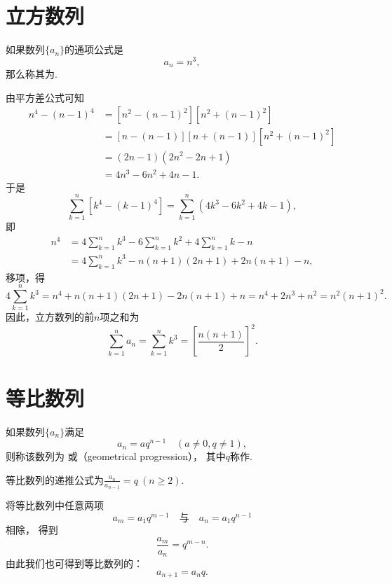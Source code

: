 \section{立方数列}
如果数列\(\{a_n\}\)的通项公式是\[
a_n = n^3,
\]那么称其为.

由平方差公式可知
\[\begin{aligned}
n^4 - (n-1)^4
&= [n^2 - (n-1)^2] [n^2 + (n-1)^2] \\
&= [n - (n-1)] [n + (n-1)] [n^2 + (n-1)^2] \\
&= (2n-1) (2n^2 - 2n + 1) \\
&= 4n^3 - 6n^2 + 4n - 1.
\end{aligned}\]
于是\[
\sum_{k=1}^n [k^4 - (k-1)^4]
= \sum_{k=1}^n (4k^3 - 6k^2 + 4k - 1),
\]即\[\begin{aligned}
n^4
&= 4 \sum_{k=1}^n k^3 - 6 \sum_{k=1}^n k^2 + 4 \sum_{k=1}^n k - n \\
&= 4 \sum_{k=1}^n k^3 - n(n+1)(2n+1) + 2n(n+1) - n,
\end{aligned}\]
移项，得\[
4 \sum_{k=1}^n k^3
= n^4 + n(n+1)(2n+1) - 2n(n+1) + n
= n^4 + 2n^3 + n^2
= n^2(n+1)^2.
\]
因此，立方数列的前\(n\)项之和为
\begin{equation}
\sum_{k=1}^n a_n
= \sum_{k=1}^n k^3
= \left[\frac{n(n+1)}{2}\right]^2.
\end{equation}

\section{等比数列}
\begin{definition}
如果数列\(\{a_n\}\)满足\[
	a_n = a q^{n-1} \quad(a\neq0,q\neq1),
\]
则称该数列为
或（geometrical progression），
其中\(q\)称作.

等比数列的递推公式为\(\frac{a_n}{a_{n-1}} = q\ (n \geq 2)\).
\end{definition}

将等比数列中任意两项\[
    a_m = a_1 q^{m-1}
    \quad\text{与}\quad
    a_n = a_1 q^{n-1}
\]相除，
得到\[
    \frac{a_m}{a_n} = q^{m-n}.
\]
由此我们也可得到等比数列的：
\begin{equation}
	a_{n+1} = a_n q.
\end{equation}

